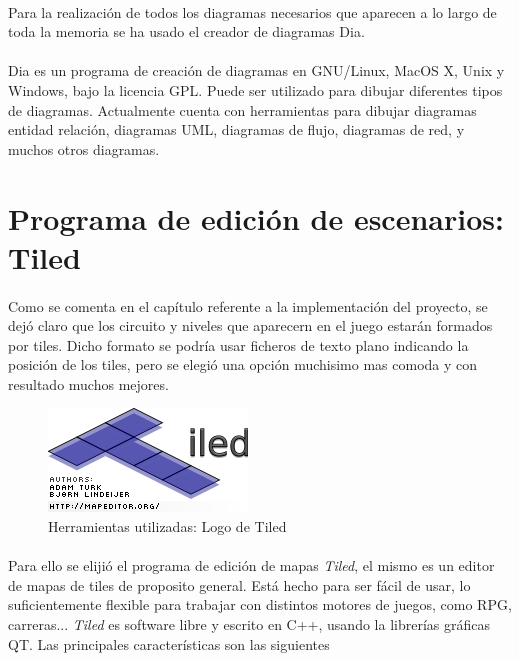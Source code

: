 \paragraph{}
Para la realización de todos los diagramas necesarios que aparecen a lo largo de toda la memoria se ha usado el creador de 
diagramas Dia.

\paragraph{}
Dia es un programa de creación de diagramas en GNU/Linux, MacOS X, Unix y Windows, bajo la 
licencia GPL. Puede ser utilizado para dibujar diferentes tipos de diagramas. Actualmente cuenta con herramientas para dibujar 
diagramas entidad relación, diagramas UML, diagramas de flujo, diagramas de red, y muchos otros diagramas.

\section{Programa de edición de escenarios: Tiled}

\paragraph{}
Como se comenta en el capítulo referente a la implementación del proyecto, se dejó claro que los circuito y niveles que aparecern
en el juego estarán formados por tiles. Dicho formato se podría usar ficheros de texto plano indicando la posición de 
los tiles, pero se elegió una opción muchisimo mas comoda y con resultado muchos mejores.

\begin{figure}[H]
  \label{tiled_logo}
  \begin{center}
    \includegraphics[scale=1]{imagenes/tiled_logo.png}
  \end{center}
  \caption{Herramientas utilizadas: Logo de Tiled}
\end{figure}

\paragraph{}
Para ello se elijió el programa de edición de mapas \emph{Tiled}, el mismo es un editor de mapas de tiles de proposito general.
Está hecho para ser fácil de usar, lo suficientemente flexible para trabajar con distintos motores de juegos, como RPG, carreras... 
\emph{Tiled} es software libre y escrito en C++, usando la librerías gráficas QT. Las principales características son las siguientes

